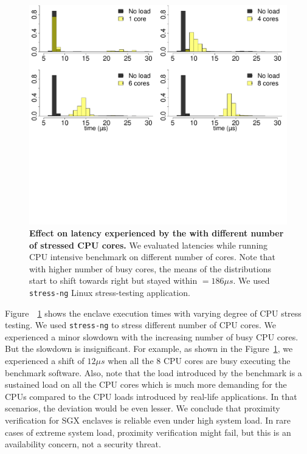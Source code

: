 \begin{figure}[t]
  \centering
    \includegraphics[trim={0 12cm 0 0}, clip, width=0.8\linewidth]{chapters/ProximiTEE/data/CPU_stress/allCore_SGX_1.pdf}
    \caption[Effect on latency experienced by the \device with different number of stressed CPU cores]{\textbf{Effect on latency experienced by the \device with different number of stressed CPU cores.} We evaluated latencies while running CPU intensive benchmark on different number of cores. Note that with higher number of busy cores, the means of the  distributions start to shift towards right but stayed within \connect $= 186\mu s$. We used \texttt{stress-ng} Linux stress-testing application.}
    \label{graph:cpuLoad_SGX}
\end{figure}


 Figure~~\ref{graph:cpuLoad_SGX} shows the enclave execution times with varying degree of CPU stress testing. We used \texttt{stress-ng} to stress different number of CPU cores. We experienced a minor slowdown with the increasing number of busy CPU cores. But the slowdown is insignificant. For example, as shown in the Figure~\ref{graph:cpuLoad_SGX}, we experienced a shift of $12\mu s$ when all the 8 CPU cores are busy executing the benchmark software. Also, note that the load introduced by the benchmark is a sustained load on all the CPU cores which is much more demanding for the CPUs compared to the CPU loads introduced by real-life applications. In that scenarios, the deviation would be even lesser. We conclude that proximity verification for SGX enclaves is reliable even under high system load. In rare cases of extreme system load, proximity verification might fail, but this is an availability concern, not a security threat.


